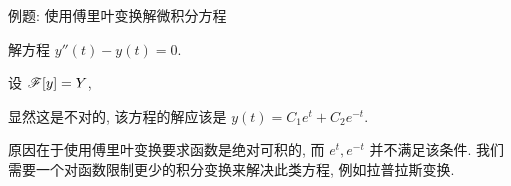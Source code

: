 \begin{frame}{例题: 使用傅里叶变换解微积分方程\noexer}
	\onslide<+->
	\begin{example}
		解方程 $y''(t)-y(t)=0$.
	\end{example}

	\onslide<+->
	\begin{solution}
			设 $\mathscr{F}[y]=Y$,
		\onslide<+->{则
			\[\msf[y''(t)-y(t)]=[(j\omega)^2-1]Y(\omega)=0,\]
		}
		\vspace{-\baselineskip}
		\onslide<+->{\[Y(\omega)=0,\quad y(t)=\msf^{-1}[Y(\omega)]=0.\]}
		\vspace{-\baselineskip}
	\end{solution}

	\onslide<+->
	显然这是不对的, 该方程的解应该是 $y(t)=C_1e^t+C_2e^{-t}$.

	\onslide<+->
	原因在于使用傅里叶变换要求函数是绝对可积的, 而 $e^t,e^{-t}$ 并不满足该条件.
	\onslide<+->
	我们需要一个对函数限制更少的积分变换来解决此类方程, 例如拉普拉斯变换.
\end{frame}

